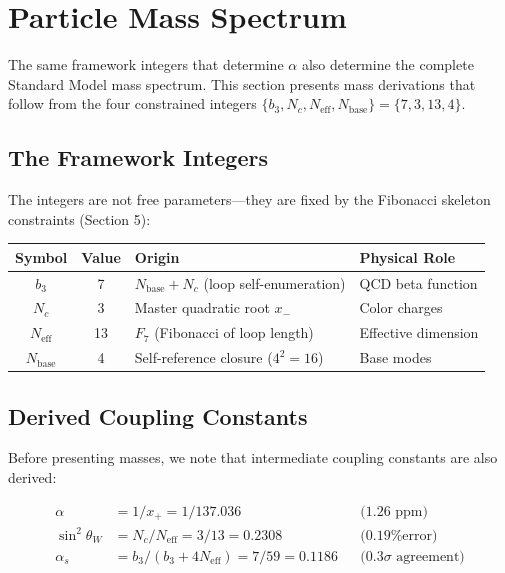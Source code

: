 \documentclass[11pt,a4paper]{article}
\theoremstyle{definition}
\theoremstyle{remark}
\newcommand{\Neff}{N_{\text{eff}}}
\begin{document}
\section{Particle Mass Spectrum}

The same framework integers that determine $\alpha$ also determine the complete Standard Model mass spectrum. This section presents mass derivations that follow from the four constrained integers $\{b_3, N_c, \Neff, N_{\text{base}}\} = \{7, 3, 13, 4\}$.

\subsection{The Framework Integers}

The integers are not free parameters---they are fixed by the Fibonacci skeleton constraints (Section 5):

\begin{center}
\begin{tabular}{ccll}
\toprule
Symbol & Value & Origin & Physical Role \\
\midrule
$b_3$ & 7 & $N_{\text{base}} + N_c$ (loop self-enumeration) & QCD beta function \\
$N_c$ & 3 & Master quadratic root $x_-$ & Color charges \\
$\Neff$ & 13 & $F_7$ (Fibonacci of loop length) & Effective dimension \\
$N_{\text{base}}$ & 4 & Self-reference closure ($4^2 = 16$) & Base modes \\
\bottomrule
\end{tabular}
\end{center}

\subsection{Derived Coupling Constants}

Before presenting masses, we note that intermediate coupling constants are also derived:

\begin{align}
\alpha &= 1/x_+ = 1/137.036 && \text{(1.26 ppm)} \\
\sin^2\theta_W &= N_c/\Neff = 3/13 = 0.2308 && \text{(0.19\% error)} \\
\alpha_s &= b_3/(b_3 + 4\Neff) = 7/59 = 0.1186 && \text{(0.3$\sigma$ agreement)}
\end{align}
\end{document}
